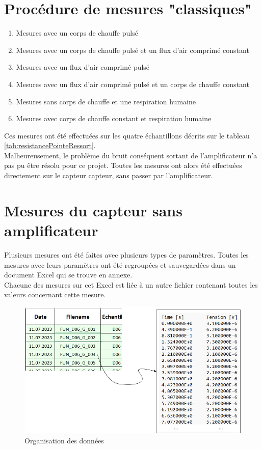 \section{Procédure de mesures "classiques"}
\begin{enumerate}
    \item Mesures avec un corps de chauffe pulsé\\
    \item Mesures avec un corps de chauffe pulsé et un flux d'air comprimé constant\\
    \item Mesures avec un flux d'air comprimé pulsé\\
    \item Mesures avec un flux d'air comprimé pulsé et un corps de chauffe constant\\
    \item Mesures sans corps de chauffe et une respiration humaine\\
    \item Mesures avec corps de chauffe constant et respiration humaine
\end{enumerate}
Ces mesures ont été effectuées sur les quatre échantillons décrits sur le tableau \ref{tab:resistancePointeRessort}. \\

Malheureusement, le problème du bruit conséquent sortant de l'amplificateur n'a pas pu être résolu pour ce projet. Toutes les mesures ont alors 
été effectuées directement sur le capteur \gls{capteur}, sans passer par l'amplificateur. 

\section{Mesures du capteur sans amplificateur}
Plusieurs mesures ont été faites avec plusieurs types de paramètres. Toutes les mesures avec leurs paramètres ont été regroupées et sauvegardées
dans un document Excel qui se trouve en annexe.\\
Chacune des mesures sur cet Excel est liée à un autre fichier contenant toutes les valeurs concernant cette mesure.
\begin{figure}[H]
    \centering
    \includegraphics[scale = 0.4]{assets/figures/Data.png}
    \caption{Organisation des données}
    \label{fig:data_orga}
\end{figure}

